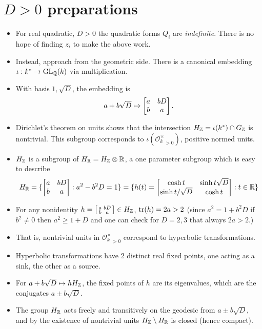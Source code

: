 \documentclass[11pt]{amsart}
\newcommand{\Of}{\mathcal{O}}
\renewcommand{\i}{\iota}
\begin{document}
\section{$D>0$ preparations}
\begin{itemize}
	\item For real quadratic, $D>0$ the quadratic forms $Q_{i}$ are \emph{indefinite}. There is no hope of finding $z_{i}$ to make the above work. 
	\item Instead, approach from the geometric side. There is a canonical embedding $\i:k^{*}\to \GL_{\Q}(k)$ via multiplication.
	\item With basis $1,\sqrt{D}$,  the embedding is 
		\begin{align*}
			a+b\sqrt{D} \mapsto\left[ \begin{matrix} a & bD \\ b & a \end{matrix} \right].
		\end{align*}
	\item Dirichlet's theorem on units shows that the intersection $H_{\Z}=\i(k^{*})\cap G_{\Z}$ is nontrivial. This subgroup corresponds to $\i({\Of^{\times}_{k}}_{>0})$, positive normed units.
	\item $H_{\mathbb{Z}}$ is a subgroup of $H_{\mathbb{R}}=H_{\mathbb{Z}}\otimes \mathbb{R}$, a one parameter subgroup which is easy to describe
		\begin{align*}
			H_{\mathbb{R}}=\{ \left[ \begin{matrix} a & bD \\ b & a \end{matrix} \right]: a^{2}-b^{2}D=1\} = \{ h(t)=\left[ \begin{matrix} \cosh t &  \sinh t \sqrt{D} \\ \sinh t/\sqrt{D} & \cosh t \end{matrix} \right] : t\in \mathbb{R}\} 
		\end{align*}
	\item For any nonidentity $h=\left[ \begin{smallmatrix} a & bD \\ b & a \end{smallmatrix} \right] \in H_{\mathbb{Z}}$,  $\operatorname{tr}(h)=2a>2$ (since $a^{2}=1+b^{2}D$ if $b^{2}\neq 0$ then $a^{2}\geq 1+D$ and one can check for $D=2,3$ that always $2a>2$.) 
	\item That is, nontrivial units in ${\Of^{\times}_{k}}_{>0}$ correspond to hyperbolic transformations.
	\item Hyperbolic transformations have $2$ distinct real fixed points, one acting as a sink, the other as a source. 
	\item For $a+b\sqrt{D} \mapsto h H_{\mathbb{Z}}$, the fixed points of $h$ are its eigenvalues, which are the conjugates $a\pm b \sqrt{D}$.
	\item The group $H_{\mathbb{R}}$ acts freely and transitively on the geodesic from $a\pm b \sqrt{D}$, and by the existence of nontrivial units $H_{\mathbb{Z}} \setminus H_{\mathbb{R}}$ is closed (hence compact).

\end{itemize}
\end{document}

